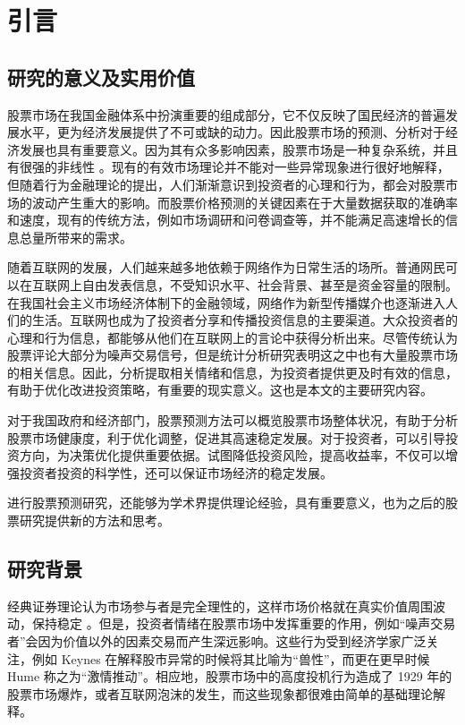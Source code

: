 \chapter{引言}

\section{研究的意义及实用价值}

股票市场在我国金融体系中扮演重要的组成部分，它不仅反映了国民经济的普遍发展水平，更为经济发展提供了不可或缺的动力。因此股票市场的预测、分析对于经济发展也具有重要意义。因为其有众多影响因素，股票市场是一种复杂系统，并且有很强的非线性 \cite{intro:0} 。现有的有效市场理论并不能对一些异常现象进行很好地解释，但随着行为金融理论的提出，人们渐渐意识到投资者的心理和行为，都会对股票市场的波动产生重大的影响。而股票价格预测的关键因素在于大量数据获取的准确率和速度，现有的传统方法，例如市场调研和问卷调查等，并不能满足高速增长的信息总量所带来的需求。

随着互联网的发展，人们越来越多地依赖于网络作为日常生活的场所。普通网民可以在互联网上自由发表信息，不受知识水平、社会背景、甚至是资金容量的限制。在我国社会主义市场经济体制下的金融领域，网络作为新型传播媒介也逐渐进入人们的生活。互联网也成为了投资者分享和传播投资信息的主要渠道。大众投资者的心理和行为信息，都能够从他们在互联网上的言论中获得分析出来。尽管传统认为股票评论大部分为噪声交易信号，但是统计分析研究表明这之中也有大量股票市场的相关信息。因此，分析提取相关情绪和信息，为投资者提供更及时有效的信息，有助于优化改进投资策略，有重要的现实意义。这也是本文的主要研究内容。

对于我国政府和经济部门，股票预测方法可以概览股票市场整体状况，有助于分析股票市场健康度，利于优化调整，促进其高速稳定发展。对于投资者，可以引导投资方向，为决策优化提供重要依据。试图降低投资风险，提高收益率，不仅可以增强投资者投资的科学性，还可以保证市场经济的稳定发展。

进行股票预测研究，还能够为学术界提供理论经验，具有重要意义，也为之后的股票研究提供新的方法和思考。

\section{研究背景}

经典证券理论认为市场参与者是完全理性的，这样市场价格就在真实价值周围波动，保持稳定 \cite{intro:1}\cite{intro:2} 。但是，投资者情绪在股票市场中发挥重要的作用，例如``噪声交易者''会因为价值以外的因素交易而产生深远影响。这些行为受到经济学家广泛关注，例如 Keynes \cite{intro:3} 在解释股市异常的时候将其比喻为``兽性''，而更在更早时候 Hume \cite{intro:4} 称之为``激情推动''。相应地，股票市场中的高度投机行为造成了 1929 年的股票市场爆炸，或者互联网泡沫的发生，而这些现象都很难由简单的基础理论解释。

